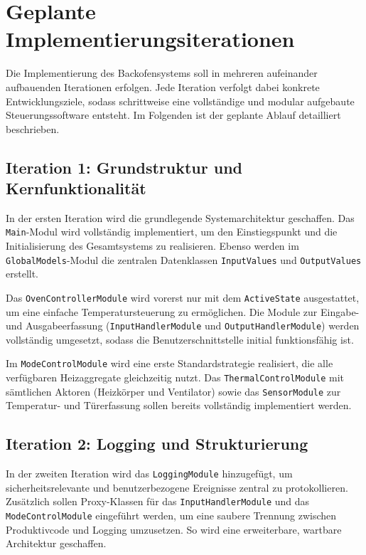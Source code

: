 \documentclass[a4paper,12pt]{article}
\begin{document}
\clearpage

\newpage

\section{Geplante Implementierungsiterationen}

Die Implementierung des Backofensystems soll in mehreren aufeinander aufbauenden Iterationen erfolgen. Jede Iteration verfolgt dabei konkrete Entwicklungsziele, sodass schrittweise eine vollständige und modular aufgebaute Steuerungssoftware entsteht. Im Folgenden ist der geplante Ablauf detailliert beschrieben.

\subsection*{Iteration 1: Grundstruktur und Kernfunktionalität}

In der ersten Iteration wird die grundlegende Systemarchitektur geschaffen. Das \texttt{Main}-Modul wird vollständig implementiert, um den Einstiegspunkt und die Initialisierung des Gesamtsystems zu realisieren. Ebenso werden im \texttt{GlobalModels}-Modul die zentralen Datenklassen \texttt{InputValues} und \texttt{OutputValues} erstellt.

Das \texttt{OvenControllerModule} wird vorerst nur mit dem \texttt{ActiveState} ausgestattet, um eine einfache Temperatursteuerung zu ermöglichen. Die Module zur Eingabe- und Ausgabeerfassung (\texttt{InputHandlerModule} und \texttt{OutputHandlerModule}) werden vollständig umgesetzt, sodass die Benutzerschnittstelle initial funktionsfähig ist.

Im \texttt{ModeControlModule} wird eine erste Standardstrategie realisiert, die alle verfügbaren Heizaggregate gleichzeitig nutzt. Das \texttt{ThermalControlModule} mit sämtlichen Aktoren (Heizkörper und Ventilator) sowie das \texttt{SensorModule} zur Temperatur- und Türerfassung sollen bereits vollständig implementiert werden.

\subsection*{Iteration 2: Logging und Strukturierung}

In der zweiten Iteration wird das \texttt{LoggingModule} hinzugefügt, um sicherheitsrelevante und benutzerbezogene Ereignisse zentral zu protokollieren. Zusätzlich sollen Proxy-Klassen für das \texttt{InputHandlerModule} und das \texttt{ModeControlModule} eingeführt werden, um eine saubere Trennung zwischen Produktivcode und Logging umzusetzen. So wird eine erweiterbare, wartbare Architektur geschaffen.
\end{document}
